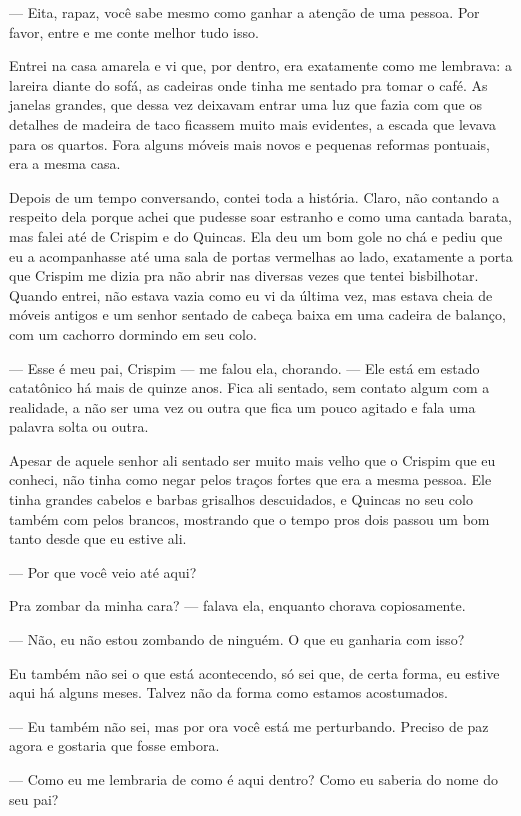— Eita, rapaz, você sabe mesmo como ganhar a atenção de uma pessoa. Por favor, entre e me conte melhor tudo isso.

Entrei na casa amarela e vi que, por dentro, era exatamente como me lembrava: a lareira diante do sofá, as cadeiras onde tinha me sentado pra tomar o café. As janelas grandes, que dessa vez deixavam entrar uma luz que fazia com que os detalhes de madeira de taco ficassem muito mais evidentes, a escada que levava para os quartos. Fora alguns móveis mais novos e pequenas reformas pontuais, era a mesma casa.

Depois de um tempo conversando, contei toda a história. Claro, não contando a respeito dela porque achei que pudesse soar estranho e como uma cantada barata, mas falei até de Crispim e do Quincas. Ela deu um bom gole no chá e pediu que eu a acompanhasse até uma sala de portas vermelhas ao lado, exatamente a porta que Crispim me dizia pra não abrir nas diversas vezes que tentei bisbilhotar. Quando entrei, não estava vazia como eu vi da última vez, mas estava cheia de móveis antigos e um senhor sentado de cabeça baixa em uma cadeira de balanço, com um cachorro dormindo em seu colo.

— Esse é meu pai, Crispim — me falou ela, chorando. — Ele está em estado catatônico há mais de quinze anos. Fica ali sentado, sem contato algum com a realidade, a não ser uma vez ou outra que fica um pouco agitado e fala uma palavra solta ou outra.

Apesar de aquele senhor ali sentado ser muito mais velho que o Crispim que eu conheci, não tinha como negar pelos traços fortes que era a mesma pessoa. Ele tinha grandes cabelos e barbas grisalhos descuidados, e Quincas no seu colo também com pelos brancos, mostrando que o tempo pros dois passou um bom tanto desde que eu estive ali.

— Por que você veio até aqui?

 Pra zombar da minha cara? — falava ela, enquanto chorava copiosamente.

— Não, eu não estou zombando de ninguém. O que eu ganharia com isso?

Eu também não sei o que está acontecendo, só sei que, de certa forma, eu estive aqui há alguns meses. Talvez não da forma como estamos acostumados.

— Eu também não sei, mas por ora você está me perturbando. Preciso de paz agora e gostaria que fosse embora.

— Como eu me lembraria de como é aqui dentro? Como eu saberia do nome do seu pai?

